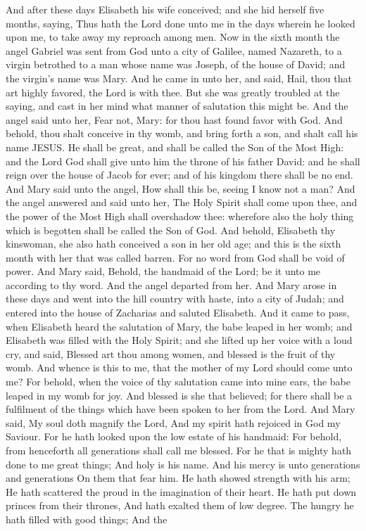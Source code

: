 And after these days Elisabeth his wife conceived; and she hid herself five months, saying, Thus hath the Lord done unto me in the days wherein he looked upon me, to take away my reproach among men.  Now in the sixth month the angel Gabriel was sent from God unto a city of Galilee, named Nazareth, to a virgin betrothed to a man whose name was Joseph, of the house of David; and the virgin’s name was Mary. And he came in unto her, and said, Hail, thou that art highly favored, the Lord is with thee. But she was greatly troubled at the saying, and cast in her mind what manner of salutation this might be. And the angel said unto her, Fear not, Mary: for thou hast found favor with God. And behold, thou shalt conceive in thy womb, and bring forth a son, and shalt call his name JESUS. He shall be great, and shall be called the Son of the Most High: and the Lord God shall give unto him the throne of his father David: and he shall reign over the house of Jacob for ever; and of his kingdom there shall be no end. And Mary said unto the angel, How shall this be, seeing I know not a man? And the angel answered and said unto her, The Holy Spirit shall come upon thee, and the power of the Most High shall overshadow thee: wherefore also the holy thing which is begotten shall be called the Son of God. And behold, Elisabeth thy kinswoman, she also hath conceived a son in her old age; and this is the sixth month with her that was called barren. For no word from God shall be void of power. And Mary said, Behold, the handmaid of the Lord; be it unto me according to thy word. And the angel departed from her.  And Mary arose in these days and went into the hill country with haste, into a city of Judah; and entered into the house of Zacharias and saluted Elisabeth. And it came to pass, when Elisabeth heard the salutation of Mary, the babe leaped in her womb; and Elisabeth was filled with the Holy Spirit; and she lifted up her voice with a loud cry, and said, Blessed art thou among women, and blessed is the fruit of thy womb. And whence is this to me, that the mother of my Lord should come unto me? For behold, when the voice of thy salutation came into mine ears, the babe leaped in my womb for joy. And blessed is she that believed; for there shall be a fulfilment of the things which have been spoken to her from the Lord. And Mary said, My soul doth magnify the Lord,  And my spirit hath rejoiced in God my Saviour.  For he hath looked upon the low estate of his handmaid: For behold, from henceforth all generations shall call me blessed.  For he that is mighty hath done to me great things; And holy is his name.  And his mercy is unto generations and generations On them that fear him.  He hath showed strength with his arm; He hath scattered the proud in the imagination of their heart.  He hath put down princes from their thrones, And hath exalted them of low degree.  The hungry he hath filled with good things; And the 